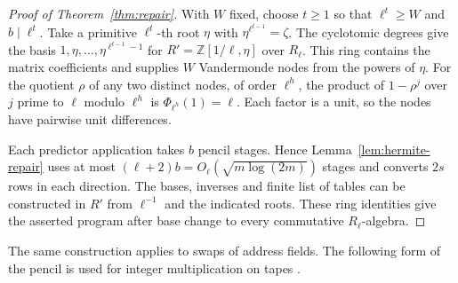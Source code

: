 

\begin{proof}[Proof of Theorem~\ref{thm:repair}]
With \(W\) fixed, choose \(t\ge1\) so that \(\ell^t\ge W\) and
\(b\mid\ell^t\). Take a primitive \(\ell^t\)-th root \(\eta\) with
\(\eta^{\ell^{t-1}}=\zeta\). The cyclotomic degrees give the basis
\(1,\eta,\ldots,\eta^{\ell^{t-1}-1}\) for
\(R'=\mathbb Z[1/\ell,\eta]\) over \(R_\ell\). This ring contains the
matrix coefficients and supplies \(W\) Vandermonde nodes from the
powers of \(\eta\). For the quotient \(\rho\) of any two distinct
nodes, of order \(\ell^h\), the product of \(1-\rho^j\) over \(j\)
prime to \(\ell\) modulo \(\ell^h\) is \(\Phi_{\ell^h}(1)=\ell\).
Each factor is a unit, so the nodes have pairwise unit differences.

Each predictor application takes \(b\) pencil stages. Hence
Lemma~\ref{lem:hermite-repair} uses at most
\((\ell+2)b=O_\ell(\sqrt{m\log(2m)})\) stages and converts \(2s\)
rows in each direction. The bases, inverses and finite list of tables
can be constructed in \(R'\) from \(\ell^{-1}\) and the indicated
roots. These ring identities give the asserted program after base
change to every commutative \(R_\ell\)-algebra.
\end{proof}

The same construction applies to swaps of address fields. The following
form of the pencil is used for integer multiplication on tapes
\cite{oaT}.

